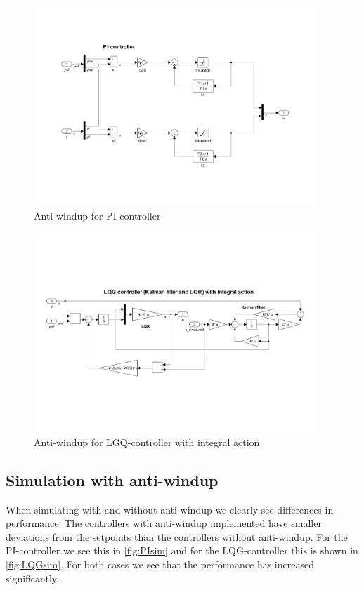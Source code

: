 \documentclass[a4paper]{scrartcl}
\begin{document}
\begin{figure}[ht!]
	\centering
	\includegraphics[width=0.95\textwidth]{fig/simulink/PI_antiwindup.pdf}
	\caption{Anti-windup for PI controller}
	\label{fig:1PIantiwindup}
\end{figure}
\begin{figure}[ht!]
	\centering
	\includegraphics[width=0.95\textwidth]{fig/simulink/LQG_antiwindup.PDF}
	\caption{Anti-windup for LGQ-controller with integral action}
	\label{fig:1LQGantiwindup}
\end{figure}

\subsection{Simulation with anti-windup}
When simulating with and without anti-windup we clearly see differences in performance. The controllers with anti-windup implemented have smaller deviations from the setpoints than the controllers without anti-windup. For the PI-controller we see this in \autoref{fig:PIsim} and for the LQG-controller this is shown in \autoref{fig:LQGsim}. For both cases we see that the performance has increased significantly. 
\end{document}

